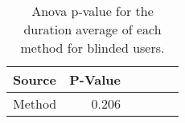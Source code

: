 
\begin{table}[!htb]
\centering
\caption{Anova p-value for the duration average of each method for blinded users.}
\label{tab:blockedanova_duration_avg}
\begin{tabular}{lrrrrr}
\toprule
Source & P-Value \\
\midrule
Method &   0.206 \\
\bottomrule
\end{tabular}
\end{table}

